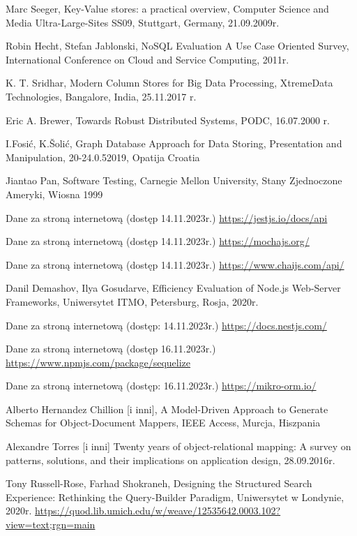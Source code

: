 \documentclass[12pt, a4paper, twoside, openany]{book}
\begin{document}
{\begin{enumerate}[label={[}\arabic*{]}]
    \item Marc Seeger, Key-Value stores: a practical overview, Computer Science and Media Ultra-Large-Sites SS09, Stuttgart, Germany, 21.09.2009r.
    \item Robin Hecht, Stefan Jablonski, NoSQL Evaluation A Use Case Oriented Survey, International Conference on Cloud and Service Computing, 2011r.
    \item K. T. Sridhar, Modern Column Stores for Big Data Processing, XtremeData Technologies, Bangalore, India, 25.11.2017 r.
    \item Eric A. Brewer, Towards Robust Distributed Systems, PODC, 16.07.2000 r.
    \item I.Fosić, K.Šolić, Graph Database Approach for Data Storing, Presentation and Manipulation, 20-24.0.52019, Opatija Croatia
    \item Jiantao Pan, Software Testing, Carnegie Mellon University, Stany Zjednoczone Ameryki, Wiosna 1999
    \item Dane za stroną internetową (dostęp 14.11.2023r.) \url{https://jestjs.io/docs/api}
    \item Dane za stroną internetową (dostęp 14.11.2023r.) \url{https://mochajs.org/}
    \item Dane za stroną internetową (dostęp 14.11.2023r.) \url{https://www.chaijs.com/api/}
    \item Danil Demashov, Ilya Gosudarve, Efficiency Evaluation of Node.js Web-Server Frameworks, Uniwersytet ITMO, Petersburg, Rosja, 2020r.
    \item Dane za stroną internetową (dostęp: 14.11.2023r.) \url{https://docs.nestjs.com/}
    \item Dane za stroną internetową (dostęp 16.11.2023r.) \url{https://www.npmjs.com/package/sequelize}
    \item Dane za stroną internetową (dostęp: 16.11.2023r.) \url{https://mikro-orm.io/}
    \item Alberto Hernandez Chillion [i inni], A Model-Driven Approach to Generate Schemas for Object-Document Mappers, IEEE Access, Murcja, Hiszpania
    \item Alexandre Torres [i inni] Twenty years of object-relational mapping: A survey on patterns, solutions, and their implications on application design, 28.09.2016r.
    \item Tony Russell-Rose, Farhad Shokraneh, Designing the Structured Search Experience: Rethinking the Query-Builder Paradigm, Uniwersytet w Londynie, 2020r. \url{https://quod.lib.umich.edu/w/weave/12535642.0003.102?view=text;rgn=main}

\end{enumerate}}
\end{document}
